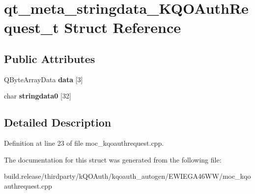 \hypertarget{structqt__meta__stringdata___k_q_o_auth_request__t}{}\section{qt\+\_\+meta\+\_\+stringdata\+\_\+\+K\+Q\+O\+Auth\+Request\+\_\+t Struct Reference}
\label{structqt__meta__stringdata___k_q_o_auth_request__t}
\subsection*{Public Attributes}
\begin{DoxyCompactItemize}
\item 
\mbox{\label{structqt__meta__stringdata___k_q_o_auth_request__t_ac6f2bcce1579f5df5fce93b64f3fe87f}} 
Q\+Byte\+Array\+Data {\bfseries data} \mbox{[}3\mbox{]}
\item 
\mbox{\label{structqt__meta__stringdata___k_q_o_auth_request__t_a25d61b484ed43c1821c07e0be387f6d1}} 
char {\bfseries stringdata0} \mbox{[}32\mbox{]}
\end{DoxyCompactItemize}


\subsection{Detailed Description}


Definition at line 23 of file moc\+\_\+kqoauthrequest.\+cpp.



The documentation for this struct was generated from the following file\+:\begin{DoxyCompactItemize}
\item 
build.\+release/thirdparty/k\+Q\+O\+Auth/kqoauth\+\_\+autogen/\+E\+W\+I\+E\+G\+A46\+W\+W/moc\+\_\+kqoauthrequest.\+cpp\end{DoxyCompactItemize}
